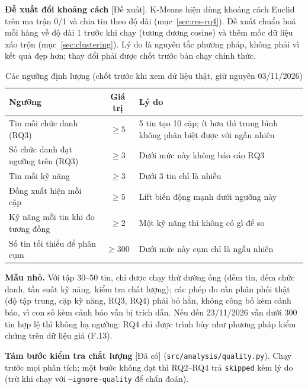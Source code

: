 \documentclass[12pt]{article}
\newcommand{\code}[1]{\texttt{#1}}
\newcommand{\dacoi}{\textsf{[Đã có]}}
\newcommand{\dexuat}{\textsf{[Đề xuất]}}
\begin{document}
\textbf{Đề xuất đổi khoảng cách} \dexuat{}. K-Means hiện dùng khoảng cách Euclid trên ma trận 0/1 và chia tin theo độ dài (mục~\ref{sec:res-rq4}). Đề xuất chuẩn hoá mỗi hàng về độ dài 1 trước khi chạy (tương đương cosine) và thêm mốc dữ liệu xáo trộn (mục~\ref{sec:clustering}). Lý do là nguyên tắc phương pháp, không phải vì kết quả đẹp hơn; thay đổi phải được chốt trước bản chạy chính thức.

\begin{table}[htbp]
\centering
\caption{Các ngưỡng định lượng (chốt trước khi xem dữ liệu thật, giữ nguyên 03/11/2026)}
\label{tab:thresholds}
\renewcommand{\arraystretch}{1.15}
\begin{tabularx}{\textwidth}{l c X}
\toprule
\textbf{Ngưỡng} & \textbf{Giá trị} & \textbf{Lý do} \\
\midrule
Tin mỗi chức danh (RQ3) & $\ge 5$ & 5 tin tạo 10 cặp; ít hơn thì trung bình không phân biệt được với ngẫu nhiên \\
Số chức danh đạt ngưỡng trên (RQ3) & $\ge 3$ & Dưới mức này không báo cáo RQ3 \\
Tin mỗi kỹ năng & $\ge 3$ & Dưới 3 tin chỉ là nhiễu \\
Đồng xuất hiện mỗi cặp & $\ge 5$ & Lift biến động mạnh dưới ngưỡng này \\
Kỹ năng mỗi tin khi đo tương đồng & $\ge 2$ & Một kỹ năng thì không có gì để so \\
Số tin tối thiểu để phân cụm & $\ge 300$ & Dưới mức này cụm chỉ là ngẫu nhiên \\
\bottomrule
\end{tabularx}
\end{table}

\textbf{Mẫu nhỏ.} Với tập 30--50 tin, chỉ được chạy thử đường ống (đếm tin, đếm chức danh, tần suất kỹ năng, kiểm tra chất lượng); các phép đo cần phân phối thật (độ tập trung, cặp kỹ năng, RQ3, RQ4) phải bỏ hẳn, không công bố kèm cảnh báo, vì con số kèm cảnh báo vẫn bị trích dẫn. Nếu đến 23/11/2026 vẫn dưới 300 tin hợp lệ thì không hạ ngưỡng: RQ4 chỉ được trình bày như phương pháp kiểm chứng trên dữ liệu giả (F.13).

\textbf{Tám bước kiểm tra chất lượng} \dacoi{} (\code{src/analysis/quality.py}). Chạy trước mọi phân tích; một bước không đạt thì RQ2--RQ4 trả \code{skipped} kèm lý do (trừ khi chạy với \code{--ignore-quality} để chẩn đoán).
\end{document}

